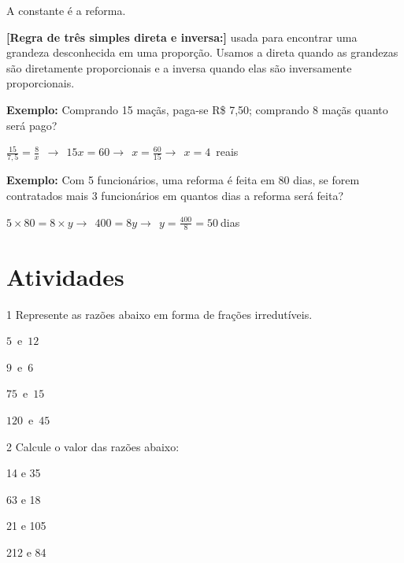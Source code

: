 A constante é a reforma.

\textbf{{[}Regra de três simples direta e inversa:{]}} usada para
encontrar uma grandeza desconhecida em uma proporção. Usamos a direta
quando as grandezas são diretamente proporcionais e a inversa quando
elas são inversamente proporcionais.

\textbf{Exemplo:} Comprando 15 maçãs, paga-se R\$ 7,50; comprando 8
maçãs quanto será pago?

$\frac{15}{7,5} = \frac{8}{x}\ \  \rightarrow \ \ 15x = 60 \rightarrow \ \ x = \frac{60}{15} \rightarrow \ \ x = 4$\ reais

\textbf{Exemplo:} Com 5 funcionários, uma reforma é feita em 80 dias, se
forem contratados mais 3 funcionários em quantos dias a reforma será
feita?

$5 \times 80 = 8 \times y \rightarrow \ \ 400 = 8y \rightarrow \ \ y = \frac{400}{8} = 50\ $dias

\section{Atividades}

\num{1} Represente as razões abaixo em forma de frações irredutíveis.

\begin{escolha}
\item $5$\ e\ $12$  \\
\item $9$\ e\ $6$  \\
\item $75$\ e\ $15$  \\
\item $120$\ e\ $45$  \\
\end{escolha}

\num{2} Calcule o valor das razões abaixo:

\begin{escolha}
\item 14 e 35  \\
\item 63 e 18  \\
\item 21 e 105  \\
\item 212 e 84  \\
\end{escolha}

